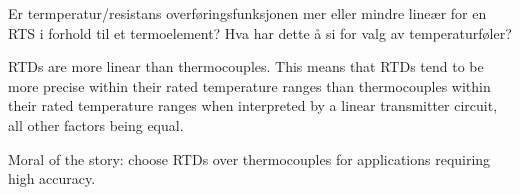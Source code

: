 


Er termperatur/resistans overføringsfunksjonen mer eller mindre line{\ae}r for en RTS i forhold til et termoelement? Hva har dette å si for valg av temperaturføler?







RTDs are more linear than thermocouples.  This means that RTDs tend to be more precise within their rated temperature ranges than thermocouples within their rated temperature ranges when interpreted by a linear transmitter circuit, all other factors being equal. 







Moral of the story: choose RTDs over thermocouples for applications requiring high accuracy.




